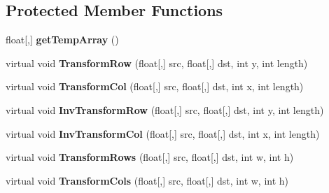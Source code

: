 \subsection*{\-Protected \-Member \-Functions}
\begin{DoxyCompactItemize}
\item 
\hypertarget{class_turbo_wavelets_1_1_wavelet2_d_a3dc6269869eb9c864f615e42d7822153}{float\mbox{[},\mbox{]} {\bfseries get\-Temp\-Array} ()}\label{class_turbo_wavelets_1_1_wavelet2_d_a3dc6269869eb9c864f615e42d7822153}

\item 
\hypertarget{class_turbo_wavelets_1_1_wavelet2_d_af0339475762d327f9d8ec019079cdc28}{virtual void {\bfseries \-Transform\-Row} (float\mbox{[},\mbox{]} src, float\mbox{[},\mbox{]} dst, int y, int length)}\label{class_turbo_wavelets_1_1_wavelet2_d_af0339475762d327f9d8ec019079cdc28}

\item 
\hypertarget{class_turbo_wavelets_1_1_wavelet2_d_a6a6c334fb499d248b72215001ff5e9d4}{virtual void {\bfseries \-Transform\-Col} (float\mbox{[},\mbox{]} src, float\mbox{[},\mbox{]} dst, int x, int length)}\label{class_turbo_wavelets_1_1_wavelet2_d_a6a6c334fb499d248b72215001ff5e9d4}

\item 
\hypertarget{class_turbo_wavelets_1_1_wavelet2_d_ac0b65a648f05436b54aa4d925812e1d5}{virtual void {\bfseries \-Inv\-Transform\-Row} (float\mbox{[},\mbox{]} src, float\mbox{[},\mbox{]} dst, int y, int length)}\label{class_turbo_wavelets_1_1_wavelet2_d_ac0b65a648f05436b54aa4d925812e1d5}

\item 
\hypertarget{class_turbo_wavelets_1_1_wavelet2_d_a9897e5e3f830ab7ea106e6bcf367fa07}{virtual void {\bfseries \-Inv\-Transform\-Col} (float\mbox{[},\mbox{]} src, float\mbox{[},\mbox{]} dst, int x, int length)}\label{class_turbo_wavelets_1_1_wavelet2_d_a9897e5e3f830ab7ea106e6bcf367fa07}

\item 
\hypertarget{class_turbo_wavelets_1_1_wavelet2_d_a95e430713dc5e27ebf7b254d1346777e}{virtual void {\bfseries \-Transform\-Rows} (float\mbox{[},\mbox{]} src, float\mbox{[},\mbox{]} dst, int w, int h)}\label{class_turbo_wavelets_1_1_wavelet2_d_a95e430713dc5e27ebf7b254d1346777e}

\item 
\hypertarget{class_turbo_wavelets_1_1_wavelet2_d_a7aae90825e937ebb7822c2daa976d22a}{virtual void {\bfseries \-Transform\-Cols} (float\mbox{[},\mbox{]} src, float\mbox{[},\mbox{]} dst, int w, int h)}\label{class_turbo_wavelets_1_1_wavelet2_d_a7aae90825e937ebb7822c2daa976d22a}


\end{DoxyCompactItemize}
